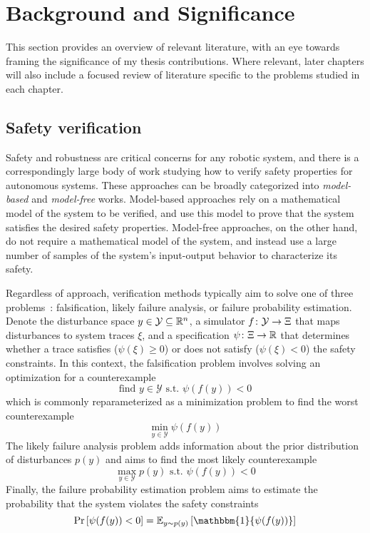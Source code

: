 \chapter{Background and Significance}\label{section:lit_review}

This section provides an overview of relevant literature, with an eye towards framing the significance of my thesis contributions. Where relevant, later chapters will also include a focused review of literature specific to the problems studied in each chapter.

\section{Safety verification}

Safety and robustness are critical concerns for any robotic system, and there is a correspondingly large body of work studying how to verify safety properties for autonomous systems. These approaches can be broadly categorized into \textit{model-based} and \textit{model-free} works. Model-based approaches rely on a mathematical model of the system to be verified, and use this model to prove that the system satisfies the desired safety properties. Model-free approaches, on the other hand, do not require a mathematical model of the system, and instead use a large number of samples of the system's input-output behavior to characterize its safety.

Regardless of approach, verification methods typically aim to solve one of three problems~\cite{corsoSurveyAlgorithmsBlackBox2021}: falsification, likely failure analysis, or failure probability estimation. Denote the disturbance space $y \in \mathcal{Y} \subseteq \mathbb{R}^n$, a simulator $f \colon \mathcal{Y} \to \Xi$ that maps disturbances to system traces $\xi$, and a specification $\psi \colon \Xi \to \mathbb{R}$ that determines whether a trace satisfies ($\psi(\xi) \geq 0$) or does not satisfy ($\psi(\xi) < 0$) the safety constraints. In this context, the falsification problem involves solving an optimization for a counterexample
%
\begin{equation}
    \text{find } {y \in \mathcal{Y}} \text{ s.t. } \psi(f(y)) < 0
\end{equation}
%
which is commonly reparameterized as a minimization problem to find the worst counterexample
%
\begin{equation}
    \min_{y \in \mathcal{Y}} \psi(f(y))\label{ch4:eq:falsification_opt}
\end{equation}
%
The likely failure analysis problem adds information about the prior distribution of disturbances $p(y)$ and aims to find the most likely counterexample
%
\begin{equation}
    \max_{y \in \mathcal{Y}} p(y) \text{ s.t. } \psi(f(y)) < 0 \label{ch4:eq:likely_failure_opt}
\end{equation}
%
Finally, the failure probability estimation problem aims to estimate the probability that the system violates the safety constraints
%
\begin{equation}
    \Pr\left[\psi(f(y)) < 0\right] = \mathbb{E}_{y \sim p(y)}\left[\mathbbm{1}\{\psi(f(y))\} \right] \label{ch4:eq:failure_probability}
\end{equation}


